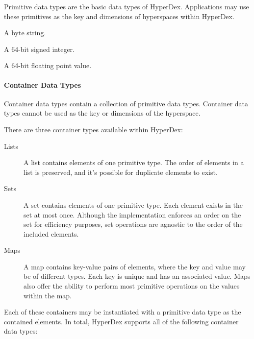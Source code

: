 Primitive data types are the basic data types of HyperDex.  Applications may use
these primitives as the key and dimensions of hyperspaces within HyperDex.

\begin{description}[noitemsep]
\item[\code{HYPERDATATYPE\_STRING}] A byte string.
\item[\code{HYPERDATATYPE\_INT64}] A 64-bit signed integer.
\item[\code{HYPERDATATYPE\_FLOAT}] A 64-bit floating point value.
\end{description}

\paragraph{Container Data Types}

Container data types contain a collection of primitive data types.  Container
data types cannot be used as the key or dimensions of the hyperspace.

There are three container types available within HyperDex:

\begin{description}
\item[Lists] A list contains elements of one primitive type.  The order of
    elements in a list is preserved, and it's possible for duplicate elements to
    exist.
\item[Sets] A set contains elements of one primitive type.  Each element exists
    in the set at most once.  Although the implementation enforces an order on
    the set for efficiency purposes, set operations are agnostic to the order of
    the included elements.
\item[Maps] A map contains key-value pairs of elements, where the key and value
    may be of different types.  Each key is unique and has an associated value.
    Maps also offer the ability to perform most primitive operations on the
    values within the map.
\end{description}

Each of these containers may be instantiated with a primitive data type as the
contained elements.  In total, HyperDex supports all of the following container
data types:

